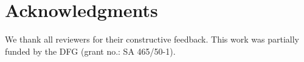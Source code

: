 \documentclass[runningheads,a4paper]{llncs}
\begin{document}

\section*{Acknowledgments}
We thank all reviewers for their constructive feedback. This work was partially funded by the DFG (grant no.: SA 465/50-1).



 
\end{document}
